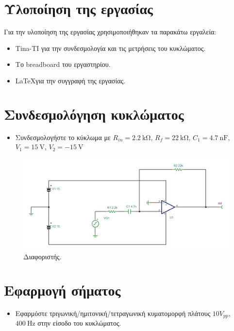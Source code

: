 \documentclass[12pt]{article}
\begin{document}
\section{Υλοποίηση της εργασίας}

Για την υλοποίηση της εργασίας χρησιμοποιήθηκαν τα παρακάτω εργαλεία:
\begin{itemize}
	\item Tina-TI για την συνδεσμολογία και τις μετρήσεις του κυκλώματος.
	\item Το breadboard του εργαστηρίου.
	\item \LaTeX για την συγγραφή της εργασίας.
\end{itemize}

\section{Συνδεσμολόγηση κυκλώματος}

\begin{itemize}
	\item Συνδεσμολογήστε το κύκλωμα με $R_{in} = \SI{2.2}{\kohm}$,
		$R_f = \SI{22}{\kohm}$, $C_1 = \SI{4.7}{\nano\farad}$,
		$V_1 = \SI{15}{\volt}$, $V_2 = \SI{-15}{\volt}$
\end{itemize}

\begin{figure}[H]
	\centering
	\includegraphics[width=\linewidth]{./res/schem.jpg}
	\caption{Διαφοριστής.}
\end{figure}

\section{Εφαρμογή σήματος}

\begin{itemize}
	\item Εφαρμόστε τριγωνική/ημιτονική/τετραγωνική κυματομορφή πλάτους
		$10V_{pp}$, $\SI{400}{\hertz}$ στην είσοδο του κυκλώματος.
\end{itemize}
\end{document}
